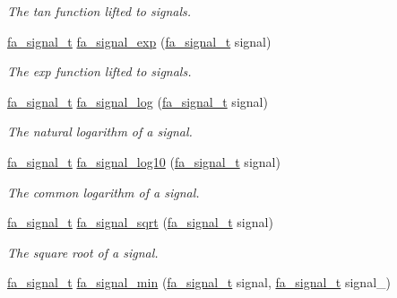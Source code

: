 \begin{DoxyCompactItemize}
\begin{DoxyCompactList}\small\item\em The tan function lifted to signals. \end{DoxyCompactList}\item 
\hyperlink{group___fa_signal_gac5c72f160cd6e93a6783551627b166e5}{fa\-\_\-signal\-\_\-t} \hyperlink{group___fa_signal_gac663bc58a2666b56ad625cf1a19b1664}{fa\-\_\-signal\-\_\-exp} (\hyperlink{group___fa_signal_gac5c72f160cd6e93a6783551627b166e5}{fa\-\_\-signal\-\_\-t} signal)
\begin{DoxyCompactList}\small\item\em The exp function lifted to signals. \end{DoxyCompactList}\item 
\hyperlink{group___fa_signal_gac5c72f160cd6e93a6783551627b166e5}{fa\-\_\-signal\-\_\-t} \hyperlink{group___fa_signal_ga10de575f65334516180a0b2c29726da6}{fa\-\_\-signal\-\_\-log} (\hyperlink{group___fa_signal_gac5c72f160cd6e93a6783551627b166e5}{fa\-\_\-signal\-\_\-t} signal)
\begin{DoxyCompactList}\small\item\em The natural logarithm of a signal. \end{DoxyCompactList}\item 
\hyperlink{group___fa_signal_gac5c72f160cd6e93a6783551627b166e5}{fa\-\_\-signal\-\_\-t} \hyperlink{group___fa_signal_gad44de1a3da96901baa553966ccb5b180}{fa\-\_\-signal\-\_\-log10} (\hyperlink{group___fa_signal_gac5c72f160cd6e93a6783551627b166e5}{fa\-\_\-signal\-\_\-t} signal)
\begin{DoxyCompactList}\small\item\em The common logarithm of a signal. \end{DoxyCompactList}\item 
\hyperlink{group___fa_signal_gac5c72f160cd6e93a6783551627b166e5}{fa\-\_\-signal\-\_\-t} \hyperlink{group___fa_signal_gad780dda370e16669acd3675b88e4201f}{fa\-\_\-signal\-\_\-sqrt} (\hyperlink{group___fa_signal_gac5c72f160cd6e93a6783551627b166e5}{fa\-\_\-signal\-\_\-t} signal)
\begin{DoxyCompactList}\small\item\em The square root of a signal. \end{DoxyCompactList}\item 
\hyperlink{group___fa_signal_gac5c72f160cd6e93a6783551627b166e5}{fa\-\_\-signal\-\_\-t} \hyperlink{group___fa_signal_gaa14788a7f91eba0d6dfa119c68ba66e8}{fa\-\_\-signal\-\_\-min} (\hyperlink{group___fa_signal_gac5c72f160cd6e93a6783551627b166e5}{fa\-\_\-signal\-\_\-t} signal, \hyperlink{group___fa_signal_gac5c72f160cd6e93a6783551627b166e5}{fa\-\_\-signal\-\_\-t} signal\-\_\-)

\end{DoxyCompactItemize}
